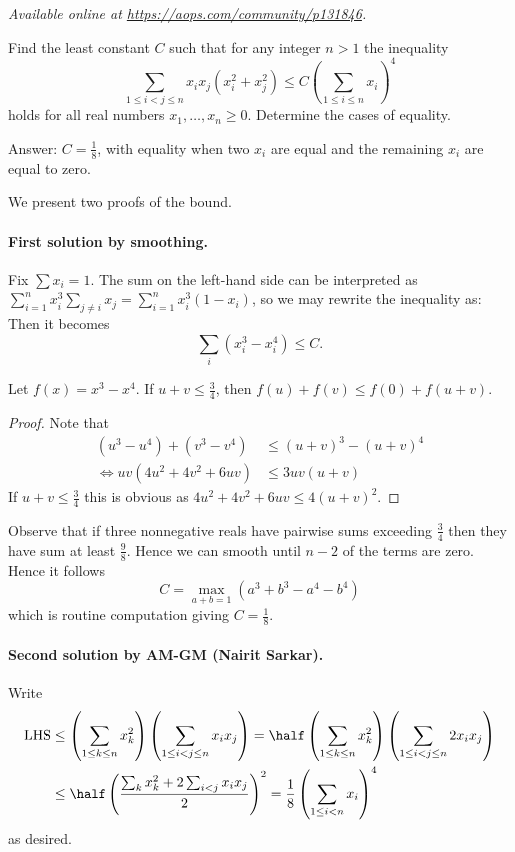 \textsl{Available online at \url{https://aops.com/community/p131846}.}
\begin{mdframed}[style=mdpurplebox,frametitle={Problem statement}]
Find the least constant $C$ such that for any integer $n > 1$ the inequality
\[\sum_{1 \le i < j \le n} x_i x_j (x_i^2 + x_j^2)
  \le C \left( \sum_{1 \le i \le n} x_i \right)^4\]
holds for all real numbers $x_1, \dots, x_n \ge 0$.
Determine the cases of equality.
\end{mdframed}
Answer: $C = \frac 18$, with equality when two $x_i$ are equal
and the remaining $x_i$ are equal to zero.

We present two proofs of the bound.

\paragraph{First solution by smoothing.}
Fix $\sum x_i = 1$.
The sum on the left-hand side can be interpreted as
$\sum_{i=1}^n x_i^3 \sum_{j \neq i} x_j = \sum_{i=1}^n x_i^3(1-x_i)$,
so we may rewrite the inequality as:
Then it becomes \[ \sum_i (x_i^3 - x_i^4) \le C. \]

\begin{claim*}
  [Smoothing]
  Let $f(x) = x^3 - x^4$.
  If $u + v \le \frac 34$, then $f(u) + f(v) \le f(0) + f(u+v)$.
\end{claim*}
\begin{proof}
  Note that
  \begin{align*}
    (u^3-u^4)+(v^3-v^4) &\le (u+v)^3-(u+v)^4 \\
    \iff uv(4u^2+4v^2+6uv) &\le 3uv(u+v)
  \end{align*}
  If $u+v\le \frac 34$ this is obvious as $4u^2+4v^2+6uv \le 4(u+v)^2$.
\end{proof}

Observe that if three nonnegative reals have pairwise sums
exceeding $\frac34$ then they have sum at least $\frac 98$.
Hence we can smooth until $n-2$ of the terms are zero.
Hence it follows
\[ C = \max_{a+b=1} (a^3+b^3-a^4-b^4) \]
which is routine computation giving $C = \frac18$.

\paragraph{Second solution by AM-GM (Nairit Sarkar).}
Write
\begin{align*}
  \text{LHS}
  &\le \left( \sum_{1 \le k \le n} x_k^2 \right)
  \left( \sum_{1 \le i < j \le n} x_i x_j \right)
  = \half \left( \sum_{1 \le k \le n} x_k^2 \right)
  \left( \sum_{1 \le i < j \le n} 2 x_i x_j \right) \\
  &\le \half \left( \frac{\sum_k x_k^2 + 2 \sum_{i<j} x_i x_j}{2}  \right)^2
  = \frac 18 \left( \sum_{1 \le i < n} x_i \right)^4
\end{align*}
as desired.
\pagebreak